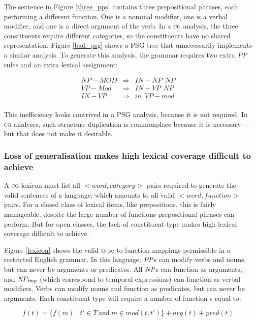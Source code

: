 \documentclass[11pt,twoside,final]{ahudson-harvard}
\newcommand{\cf}[1]{\mbox{$\it{#1}$}}   %
\newcommand{\cg}{\textsc{cg}\xspace}
\newcommand{\psg}{\textsc{PSG}\xspace}
\newcommand{\psrule}[3]{#1&\Rightarrow&#2~~#3}
\begin{document}
The sentence in Figure \ref{three_pps} contains three prepositional phrases, each performing a different function. One is a nominal modifier, one is a verbal modifier, and one is a direct argument of the verb. In a \cg analysis, the three constituents require different categories, so the constituents have no shared representation. Figure \ref{bad_psg} shows a \psg tree that unnecessarily implements a similar analysis. To generate this analysis, the grammar requires two extra \cf{PP} rules and an extra lexical assignment:

\begin{eqnarray}
 \psrule{NP-MOD}{IN-NP}{NP}\\
 \psrule{VP-Mod}{IN-VP}{NP}\\
 \psrule{IN-VP}{in}{VP-mod}\\
\end{eqnarray}

This inefficiency looks contrived in a \psg analysis, because it is not required. In \cg analyses, such structure duplication is commonplace because it is necessary --- but that does not make it desirable.

\subsubsection{Loss of generalisation makes high lexical coverage difficult to achieve}

A \cg lexicon must list all $<word, category>$ pairs required to generate the valid sentences of a language, which amounts to all valid $<word, function>$ pairs. For a closed class of lexical items, like prepositions, this is fairly manageable, despite the large number of functions prepositional phrases can perform. But for open classes, the lack of constituent type makes high lexical coverage difficult to achieve.

Figure \ref{lexicon} shows the valid type-to-function mappings permissible in a restricted English grammar. In this language, \cf{PP}s can modify verbs and nouns, but can never be arguments or predicates. All \cf{NP}s can function as arguments, and \cf{NP_{tmp}} (which correspond to temporal expressions) can function as verbal modifiers. Verbs can modify nouns and function as predicates, but can never be arguments. Each constituent type will require a number of function s equal to:

\begin{equation}
f(t) = \{f(m)\mid t' \in T~\mbox{and}~m \in mod(t, t')\} + arg(t) + pred(t)
\end{equation}
\end{document}
